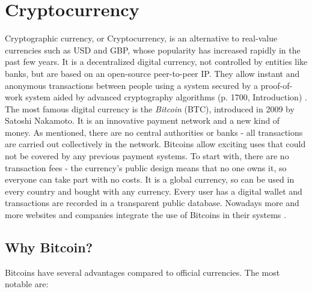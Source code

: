 \documentclass[a4paper, 12pt, titlepage]{article}
\begin{document}
\section{Cryptocurrency}
Cryptographic currency, or Cryptocurrency, is an alternative to real-value currencies such as USD and GBP, whose popularity has increased rapidly in the past few years. It is a decentralized digital currency, not controlled by entities like banks, but are based on an open-source peer-to-peer IP. They allow instant and anonymous transactions between people using a system secured by a proof-of-work system aided by advanced cryptography algorithms (p. 1700, Introduction) \cite{CryptoCurrencyIntro}. The most famous digital currency is the \textit{Bitcoin} (BTC), introduced in 2009 by Satoshi Nakamoto. It is an innovative payment network and a new kind of money. As mentioned, there are no central authorities or banks - all transactions are carried out collectively in the network. Bitcoins allow exciting uses that could not be covered by any previous payment systems. To start with, there are no transaction fees - the currency's public design means that no one owns it, so everyone can take part with no costs. It is a global currency, so can be used in every country and bought with any currency. Every user has a digital wallet and transactions are recorded in a transparent public database. Nowadays more and more websites and companies integrate the use of Bitcoins in their systems \cite{BitcoinIntro}.

\subsection{Why Bitcoin?}
Bitcoins have several advantages compared to official currencies. The most notable are:
\end{document}
